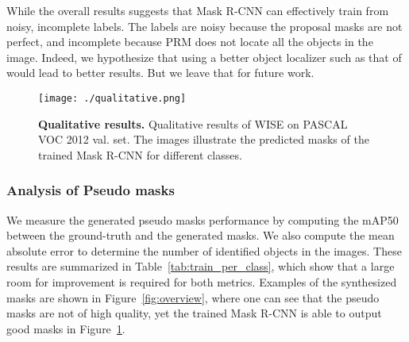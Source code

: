 \documentclass{bmvc2k}
\begin{document}
While the overall results suggests that Mask R-CNN can effectively train from noisy, incomplete labels. The labels are noisy because the proposal masks are not perfect, and incomplete because PRM does not locate all the objects in the image. Indeed, we hypothesize that using a better object localizer such as that of \citet{cholakkal2019object} would lead to better results. But we leave that for future work. 

\begin{figure}[t]
    \centering
    \texttt{[image: ./qualitative.png]}\vspace{-7mm}
    \caption{\textbf{Qualitative results.} Qualitative results of WISE on PASCAL VOC 2012 val. set. The images illustrate the predicted masks of the trained Mask R-CNN for different classes. }
    \vspace{-4mm}
    \label{fig:qualitative_results}
\end{figure}









\subsubsection{Analysis of Pseudo masks}
We measure the generated pseudo masks performance by computing the mAP50 between the ground-truth and the generated masks. We also compute the mean absolute error to determine the number of identified objects in the images. These results are summarized in Table~\ref{tab:train_per_class}, which show that a large room for improvement is required for both metrics. Examples of the synthesized masks are
shown in Figure~\ref{fig:overview}, where one can see that the pseudo masks are not of high quality, yet the trained Mask R-CNN is able to output good masks in Figure~\ref{fig:qualitative_results}.
\end{document}
